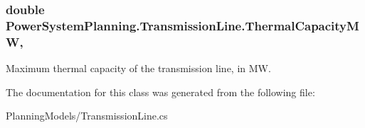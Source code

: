 \subsubsection[{\texorpdfstring{Thermal\+Capacity\+MW}{ThermalCapacityMW}}]{\setlength{\rightskip}{0pt plus 5cm}double Power\+System\+Planning.\+Transmission\+Line.\+Thermal\+Capacity\+MW\hspace{0.3cm}{\ttfamily [get]}, {\ttfamily [set]}}\hypertarget{class_power_system_planning_1_1_transmission_line_a0b11d55d8f8c39bb3f49133f02091f3c}{}\label{class_power_system_planning_1_1_transmission_line_a0b11d55d8f8c39bb3f49133f02091f3c}


Maximum thermal capacity of the transmission line, in MW. 



The documentation for this class was generated from the following file\+:\begin{DoxyCompactItemize}
\item 
Planning\+Models/Transmission\+Line.\+cs\end{DoxyCompactItemize}
